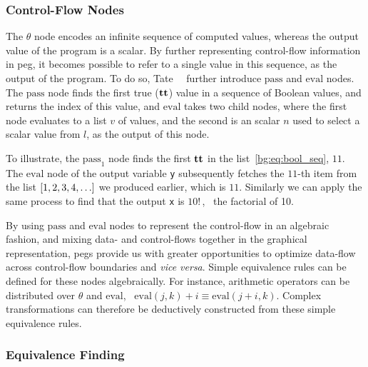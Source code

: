 \subsubsection{Control-Flow Nodes}

The $\theta$ node encodes an infinite sequence of computed values, whereas
the output value of the program is a scalar.  By further representing
control-flow information in \gls{peg}, it becomes possible to refer to a
single value in this sequence, as the output of the program.  To do so,
Tate~\etal~\cite{tate09} further introduce $\mathrm{pass}$ and $\mathrm{eval}$
nodes.  The $\mathrm{pass}$ node finds the first true ($\mathbf{tt}$) value
in a sequence of Boolean values, and returns the index of this value, and
$\mathrm{eval}$ takes two child nodes, where the first node evaluates to a list
$v$ of values, and the second is an scalar $n$ used to select a scalar value
from $l$, as the output of this node.

To illustrate, the $\mathrm{pass}_1$ node finds the first $\mathbf{tt}$ in the
list~\eqref{bg:eq:bool_seq}, $11$.  The $\mathrm{eval}$ node of the output
variable \verb|y| subsequently fetches the $11$-th item from the list $[1, 2,
3, 4, \mathellipsis]$ we produced earlier, which is $11$.  Similarly we can
apply the same process to find that the output \verb|x| is $10!\,$, \ie~the
factorial of 10.

By using $\mathrm{pass}$ and $\mathrm{eval}$ nodes to represent the
control-flow in an algebraic fashion, and mixing data- and control-flows
together in the graphical representation, \glspl{peg} provide us with
greater opportunities to optimize data-flow across control-flow boundaries
and \emph{vice versa}.  Simple equivalence rules can be defined for these
nodes algebraically.  For instance, arithmetic operators can be distributed
over $\theta$ and $\mathrm{eval}$, \eg~$\mathrm{eval}(j, k) + i \equiv
\mathrm{eval}(j + i, k)$.  Complex transformations can therefore be deductively
constructed from these simple equivalence rules.

\subsubsection{Equivalence Finding}

